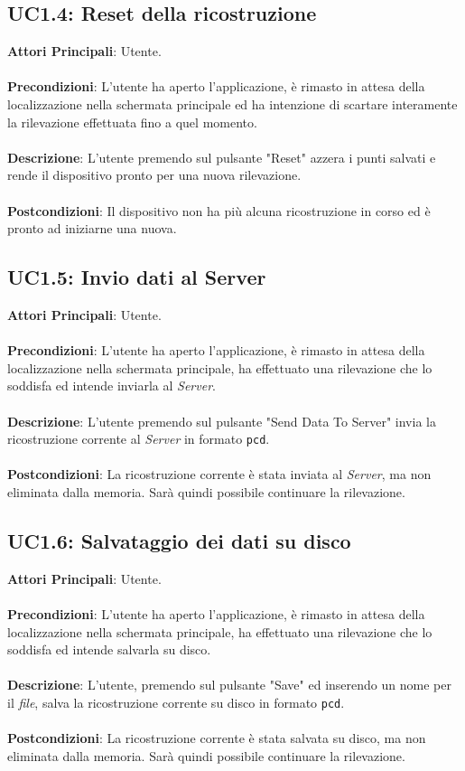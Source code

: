\subsection{UC1.4: Reset della ricostruzione}
\textbf{Attori Principali}: Utente.
\\\\ \textbf{Precondizioni}: L'utente ha aperto l'applicazione, è rimasto in attesa della localizzazione nella schermata principale ed ha intenzione di scartare interamente la rilevazione effettuata fino a quel momento.
\\\\ \textbf{Descrizione}: L'utente premendo sul pulsante "Reset" azzera i punti salvati e rende il dispositivo pronto per una nuova rilevazione.
\\\\ \textbf{Postcondizioni}: Il dispositivo non ha più alcuna ricostruzione in corso ed è pronto ad iniziarne una nuova.

\subsection{UC1.5: Invio dati al Server}
\textbf{Attori Principali}: Utente.
\\\\ \textbf{Precondizioni}: L'utente ha aperto l'applicazione, è rimasto in attesa della localizzazione nella schermata principale, ha effettuato una rilevazione che lo soddisfa ed intende inviarla al \emph{Server}.
\\\\ \textbf{Descrizione}: L'utente premendo sul pulsante "Send Data To Server" invia la ricostruzione corrente al \emph{Server} in formato \texttt{pcd}.
\\\\ \textbf{Postcondizioni}: La ricostruzione corrente è stata inviata al \emph{Server}, ma non eliminata dalla memoria. Sarà quindi possibile continuare la rilevazione.

\subsection{UC1.6: Salvataggio dei dati su disco}
\textbf{Attori Principali}: Utente.
\\\\ \textbf{Precondizioni}: L'utente ha aperto l'applicazione, è rimasto in attesa della localizzazione nella schermata principale, ha effettuato una rilevazione che lo soddisfa ed intende salvarla su disco.
\\\\ \textbf{Descrizione}: L'utente, premendo sul pulsante "Save" ed inserendo un nome per il \emph{file}, salva la ricostruzione corrente su disco in formato \texttt{pcd}.
\\\\ \textbf{Postcondizioni}: La ricostruzione corrente è stata salvata su disco, ma non eliminata dalla memoria. Sarà quindi possibile continuare la rilevazione.


